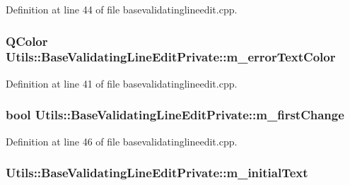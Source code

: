 Definition at line 44 of file basevalidatinglineedit.\-cpp.

\hypertarget{struct_utils_1_1_base_validating_line_edit_private_aaa0cb150a25e8081973452da11520ca8}{
\subsubsection[{m\-\_\-error\-Text\-Color}]{\setlength{\rightskip}{0pt plus 5cm}Q\-Color Utils\-::\-Base\-Validating\-Line\-Edit\-Private\-::m\-\_\-error\-Text\-Color}}\label{struct_utils_1_1_base_validating_line_edit_private_aaa0cb150a25e8081973452da11520ca8}


Definition at line 41 of file basevalidatinglineedit.\-cpp.

\hypertarget{struct_utils_1_1_base_validating_line_edit_private_aa380be78e3a48cb452f02706411f99f9}{
\subsubsection[{m\-\_\-first\-Change}]{\setlength{\rightskip}{0pt plus 5cm}bool Utils\-::\-Base\-Validating\-Line\-Edit\-Private\-::m\-\_\-first\-Change}}\label{struct_utils_1_1_base_validating_line_edit_private_aa380be78e3a48cb452f02706411f99f9}


Definition at line 46 of file basevalidatinglineedit.\-cpp.

\hypertarget{struct_utils_1_1_base_validating_line_edit_private_a8e2897fda859a5d9d1d8d5c02fd72c85}{
\subsubsection[{m\-\_\-initial\-Text}]{ Utils\-::\-Base\-Validating\-Line\-Edit\-Private\-::m\-\_\-initial\-Text}}\label{struct_utils_1_1_base_validating_line_edit_private_a8e2897fda859a5d9d1d8d5c02fd72c85}


